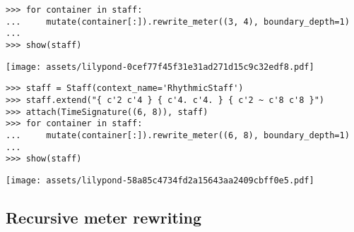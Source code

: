 \begin{comment}
<abjad>
for container in staff:
    mutate(container[:]).rewrite_meter((3, 4), boundary_depth=1)

show(staff)
</abjad>
\end{comment}

\begin{singlespacing}
\vspace{-0.5\baselineskip}
\begin{lstlisting}
>>> for container in staff:
...     mutate(container[:]).rewrite_meter((3, 4), boundary_depth=1)
...
>>> show(staff)
\end{lstlisting}
\noindent\texttt{[image: assets/lilypond-0cef77f45f31e31ad271d15c9c32edf8.pdf]}
\end{singlespacing}

\begin{comment}
<abjad>
staff = Staff(context_name='RhythmicStaff')
staff.extend("{ c'2 c'4 } { c'4. c'4. } { c'2 ~ c'8 c'8 }")
attach(TimeSignature((6, 8)), staff)
for container in staff:
    mutate(container[:]).rewrite_meter((6, 8), boundary_depth=1)

show(staff)
</abjad>
\end{comment}

\begin{singlespacing}
\vspace{-0.5\baselineskip}
\begin{lstlisting}
>>> staff = Staff(context_name='RhythmicStaff')
>>> staff.extend("{ c'2 c'4 } { c'4. c'4. } { c'2 ~ c'8 c'8 }")
>>> attach(TimeSignature((6, 8)), staff)
>>> for container in staff:
...     mutate(container[:]).rewrite_meter((6, 8), boundary_depth=1)
...
>>> show(staff)
\end{lstlisting}
\noindent\texttt{[image: assets/lilypond-58a85c4734fd2a15643aa2409cbff0e5.pdf]}
\end{singlespacing}

\subsection{Recursive meter rewriting} %

\begin{comment}
<abjad>
parseable = "abj: | 4/4 c'16 ~ c'4 d'8. ~ "
parseable += "2/3 { d'8. ~ 3/5 { d'16 e'8 ~ e'16 f'16 ~ } } "
parseable += "f'4 |"
measure = parse(parseable)
show(measure)
</abjad>
\end{comment}


